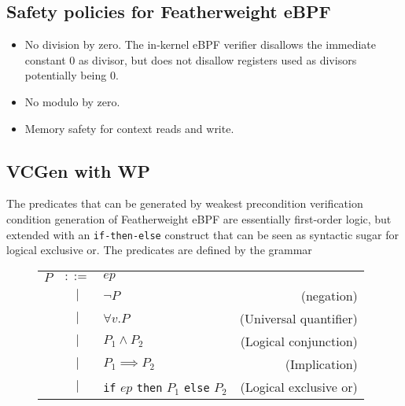 \subsection{Safety policies for Featherweight eBPF}
\label{subsec:safety_policies_for_featherweight_ebpf}


\begin{itemize}
\item No division by zero. The in-kernel eBPF verifier disallows the immediate constant 0 as divisor, but does not disallow registers used as divisors potentially being 0. 
\item No modulo by zero. 
\item Memory safety for context reads and write.

\end{itemize}


\subsection{VCGen with WP}
\label{subsec:vcgen_wp}

The predicates that can be generated by weakest precondition verification condition generation of Featherweight eBPF are essentially first-order logic, but extended with an \texttt{if-then-else} construct that can be seen as syntactic sugar for logical exclusive or. The predicates are defined by the grammar
\begin{figure}[H]
  \centering
  \begin{tabular}{lclr}
    $P$ & $::=$ & $ep$ & \\
                 & $|$ & $\neg P$ & (negation) \\    
                 & $|$ & $\forall v . P$ & (Universal quantifier) \\
                 & $|$ &  $P_1 \land P_2$ & (Logical conjunction) \\
                 & $|$ &  $P_1 \implies P_2$ & (Implication) \\
                 & $|$ &  \texttt{if} $ep$ \texttt{then} $P_1$ \texttt{else}  $P_2$ & (Logical exclusive or) \\        
\end{tabular}    
\end{figure}



